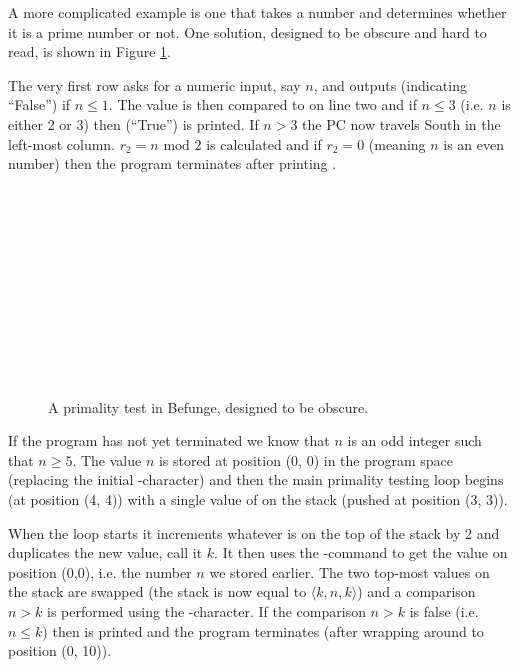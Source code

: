 \documentclass[12pt, a4paper]{article}
\begin{document}
A more complicated example is one that takes a number and determines whether it is a prime number or not. One solution, designed to be obscure and hard to read, is shown in Figure \ref{fig:prime}.

The very first row asks for a numeric input, say $n$, and outputs  (indicating “False”) if $n \leq 1$. The value is then compared to  on line two and if $n \leq 3$ (i.e. $n$ is either 2 or 3) then  (“True”) is printed. If $n > 3$ the PC now travels South in the left-most column. $r_2 = n \text{ mod } 2$ is calculated and if $r_2 = 0$ (meaning $n$ is an even number) then the program terminates after printing .

\begin{figure}[!ht]
\centering
{}\\
\\
\\
\\
\\
\\
\code{\hspace{-4em}>\^{}:}\\
\\
\code{\hspace{-4em}\$\textbackslash:}\\
\\
\caption{A primality test in Befunge, designed to be obscure.}
\label{fig:prime}
\end{figure}

If the program has not yet terminated we know that $n$ is an odd integer such that $n \geq 5$. The value $n$ is stored at position (0, 0) in the program space (replacing the initial \code{\&}-character) and then the main primality testing loop begins (at position (4, 4)) with a single value of  on the stack (pushed at position (3, 3)).

When the loop starts it increments whatever is on the top of the stack by 2 and duplicates the new value, call it $k$. It then uses the -command to get the value on position (0,0), i.e. the number $n$ we stored earlier. The two top-most values on the stack are swapped (the stack is now equal to $\langle k, n, k \rangle$) and a comparison $n > k$ is performed using the \code{\`{}}-character. If the comparison $n > k$ is false (i.e. $n \leq k$) then  is printed and the program terminates (after wrapping around to position (0, 10)).
\end{document}
